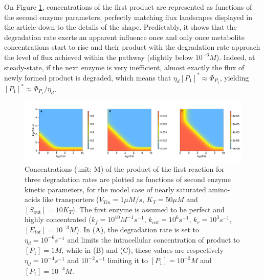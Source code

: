 On Figure \ref{fig3-ann}, concentrations of the first product are represented as functions of the second enzyme parameters, perfectly matching flux landscapes displayed in the article down to the details of the shape. Predictably, it shows that the degradation rate exerts an apparent influence once and only once metabolite concentrations start to rise and their product with the degradation rate approach the level of flux achieved within the pathway (slightly below $10^{-6}M$). Indeed, at steady-state, if the next enzyme is very inefficient, almost exactly the flux of newly formed product is degraded, which means that $\eta_d [P_1]^*\approx \Phi_{P_1}$, yielding $[P_1]^*\approx\Phi_{P_1}/ \eta_d$.



\begin{figure}[htb!]
\centering
\includegraphics[scale=0.46,trim=1cm 0cm 0cm 1cm,clip]{pics/SM-Enzymes/2DConcentrationLandscape_degrates.jpeg} 
\vspace{-0.3cm}
\caption{Concentrations (unit: M) of the product of the first reaction for three degradation rates are plotted as functions of second enzyme kinetic parameters, for the model case of nearly saturated amino-acids like transporters ($\displaystyle V_{Tm}=1 \mu M/s$, $\displaystyle K_T=50\mu M$ and $\displaystyle [S_\text{out}]=10K_T$). The first enzyme is assumed to be perfect and highly concentrated ($k_f=10^{10}M^{-1}s^{-1}$, $k_{cat}=10^6s^{-1}$, $k_r=10^3s^{-1}$, $[E_{tot}]=10^{-3}M$). In (A), the degradation rate is set to $\eta_d=10^{-6}s^{-1}$ and limits the intracellular concentration of product to $[P_{1}]=1M$, while in (B) and (C), these values are respectively $\eta_d=10^{-4}s^{-1}$ and $10^{-2}s^{-1}$ limiting it to $[P_{1}]=10^{-2}M$ and $[P_{1}]=10^{-4}M$.}
\label{fig3-ann}
\end{figure}

